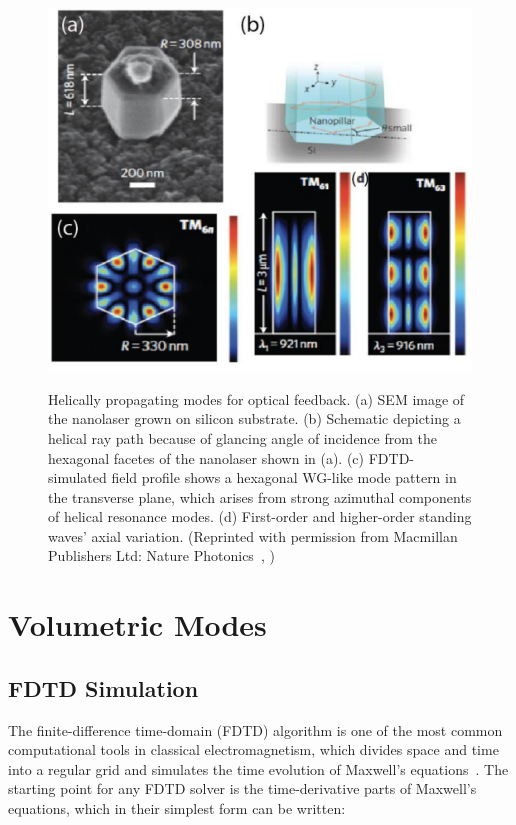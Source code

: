 \begin{figure}
  \caption{Helically propagating modes for optical feedback. (a) SEM image of the nanolaser grown on silicon substrate. (b) Schematic depicting a helical ray path because of glancing angle of incidence from the hexagonal facetes of the nanolaser shown in (a). (c) FDTD-simulated field profile shows a hexagonal WG-like mode pattern in the transverse plane, which arises from strong azimuthal components of helical resonance modes. (d) First-order and higher-order standing waves' axial variation. (Reprinted with permission from Macmillan Publishers Ltd: Nature Photonics~\cite{Chen:2011cg}, )}
  \centering
  \includegraphics[width=\textwidth]{pictures/LM/HelicalMode}
  \label{HelicalMode}
\end{figure}

\section{Volumetric Modes} \label{VM} 
\subsection{FDTD Simulation}

The finite-difference time-domain (FDTD) algorithm is one of the most common
computational tools in classical electromagnetism, which divides space and time
into a regular grid and simulates the time evolution of Maxwell's
equations~\cite{sullivan2013electromagnetic,taflove2005computational}. The
starting point for any FDTD solver is the time-derivative parts of Maxwell's
equations, which in their simplest form can be written:

